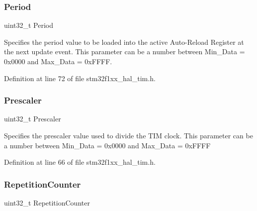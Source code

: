 \mbox{\label{struct_t_i_m___base___init_type_def_a49500eef6a2354eeee4adc005bf9cef6}} 
\subsubsection{\texorpdfstring{Period}{Period}}
{\footnotesize\ttfamily uint32\+\_\+t Period}

Specifies the period value to be loaded into the active Auto-\/\+Reload Register at the next update event. This parameter can be a number between Min\+\_\+\+Data = 0x0000 and Max\+\_\+\+Data = 0x\+F\+F\+FF. 

Definition at line 72 of file stm32f1xx\+\_\+hal\+\_\+tim.\+h.

\mbox{\label{struct_t_i_m___base___init_type_def_affb82025da5b8d4a06e61f1690460f4d}} 
\subsubsection{\texorpdfstring{Prescaler}{Prescaler}}
{\footnotesize\ttfamily uint32\+\_\+t Prescaler}

Specifies the prescaler value used to divide the T\+IM clock. This parameter can be a number between Min\+\_\+\+Data = 0x0000 and Max\+\_\+\+Data = 0x\+F\+F\+FF 

Definition at line 66 of file stm32f1xx\+\_\+hal\+\_\+tim.\+h.

\mbox{\label{struct_t_i_m___base___init_type_def_a3c2ea8434bbce30aa191a816e27f9c1f}} 
\subsubsection{\texorpdfstring{Repetition\+Counter}{RepetitionCounter}}
{\footnotesize\ttfamily uint32\+\_\+t Repetition\+Counter}

